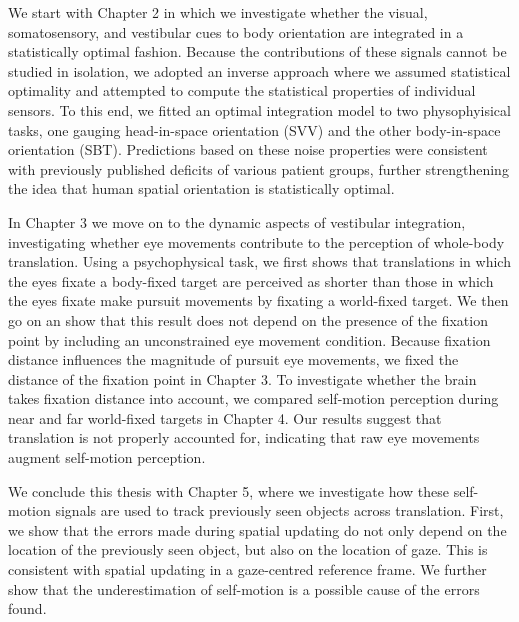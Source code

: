 We start with Chapter 2 in which we investigate whether the visual, somatosensory, and vestibular cues to body orientation are integrated in a statistically optimal fashion. Because the contributions of these signals cannot be studied in isolation, we adopted an inverse approach where we assumed statistical optimality and attempted to compute the statistical properties of individual sensors. To this end, we fitted an optimal integration model to two physophyisical tasks, one gauging head-in-space orientation (SVV) and the other body-in-space orientation (SBT). Predictions based on these noise properties were consistent with previously published deficits of various patient groups, further strengthening the idea that human spatial orientation is statistically optimal.

In Chapter 3 we move on to the dynamic aspects of vestibular integration, investigating whether eye movements contribute to the perception of whole-body translation. Using a psychophysical task, we first shows that translations in which the eyes fixate a body-fixed target are perceived as shorter than those in which the eyes fixate make pursuit movements by fixating a world-fixed target. We then go on an show that this result does not depend on the presence of the fixation point by including an unconstrained eye movement condition. Because fixation distance influences the magnitude of pursuit eye movements, we fixed the distance of the fixation point in Chapter 3. To investigate whether the brain takes fixation distance into account, we compared self-motion perception during near and far world-fixed targets in Chapter 4. Our results suggest that translation is not properly accounted for, indicating that raw eye movements augment self-motion perception.

We conclude this thesis with Chapter 5, where we investigate how these self-motion signals are used to track previously seen objects across translation. First, we show that the errors made during spatial updating do not only depend on the location of the previously seen object, but also on the location of gaze. This is consistent with spatial updating in a gaze-centred reference frame. We further show that the underestimation of self-motion is a possible cause of the errors found.
